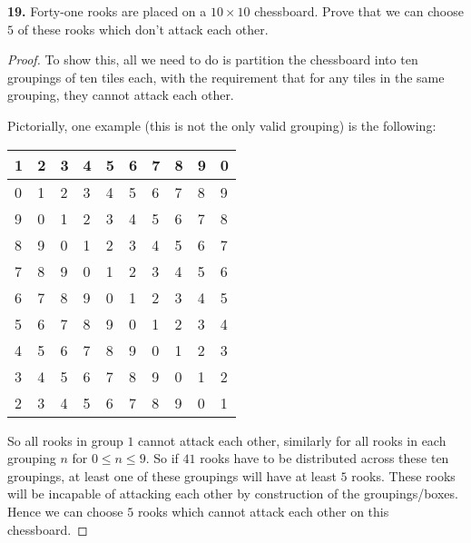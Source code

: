 \documentclass[11pt]{article}
\begin{document}
\textbf{19.} Forty-one rooks are placed on a $10\times 10$ chessboard. Prove that we can choose $5$ of these rooks which don't attack each other. \begin{proof}
    To show this, all we need to do is partition the chessboard into ten groupings of ten tiles each, with the requirement that for any tiles in the same grouping, they cannot attack each other.

    Pictorially, one example (this is not the only valid grouping) is the following: \begin{table}[h]\centering
        \begin{tabular}{|l|l|l|l|l|l|l|l|l|l|}
        \hline
        1& 2 & 3 & 4 & 5 & 6 & 7 & 8 & 9 & 0 \\ \hline
        0& 1 & 2 & 3 & 4 & 5 & 6 & 7 & 8 & 9 \\ \hline
        9& 0 & 1 & 2 & 3 & 4 & 5 & 6 & 7 & 8 \\ \hline
        8& 9 & 0 & 1 & 2 & 3 & 4 & 5 & 6 & 7 \\ \hline
        7& 8 & 9 & 0 & 1 & 2 & 3 & 4 & 5 & 6 \\ \hline
        6& 7 & 8 & 9 & 0 & 1 & 2 & 3 & 4 & 5 \\ \hline
        5& 6 & 7 & 8 & 9 & 0 & 1 & 2 & 3 & 4 \\ \hline
        4& 5 & 6 & 7 & 8 & 9 & 0 & 1 & 2 & 3 \\ \hline
        3& 4 & 5 & 6 & 7 & 8 & 9 & 0 & 1 & 2 \\ \hline
        2& 3 & 4 & 5 & 6 & 7 & 8 & 9 & 0 & 1 \\ \hline
        \end{tabular}
        \end{table}


So all rooks in group $1$ cannot attack each other, similarly for all rooks in each grouping $n$ for $0\leq n \leq 9$. So if $41$ rooks have to be distributed across these ten groupings, at least one of these groupings will have at least $5$ rooks. These rooks will be incapable of attacking each other by construction of the groupings/boxes. Hence we can choose $5$ rooks which cannot attack each other on this chessboard.
\end{proof}
\end{document}
